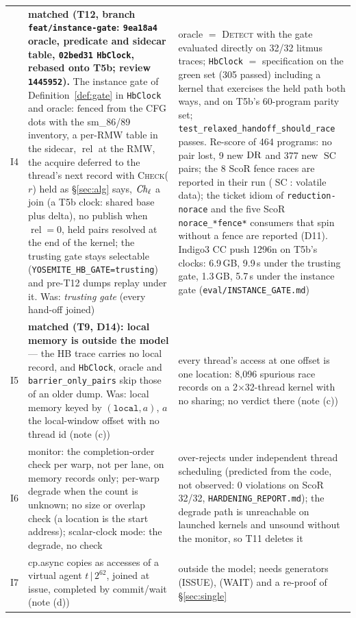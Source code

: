 \documentclass[11pt]{article}
\theoremstyle{remark}
\DeclareMathOperator{\rel}{rel}\DeclareMathOperator{\acq}{acq}\DeclareMathOperator{\key}{key}
\DeclareMathOperator{\SC}{SC}
\begin{document}
\begin{table}[!htbp]
\begin{tabular}{@{}lp{6.4cm}p{6.2cm}@{}}
I4 & \textbf{matched (T12, branch \texttt{feat/instance-gate}: \texttt{9ea18a4} oracle, predicate and sidecar table, \texttt{02bed31} \texttt{HbClock}, rebased onto T5b; review \texttt{1445952}).} The instance gate of Definition~\ref{def:gate} in \texttt{HbClock} and oracle: $\mathrm{fenced}$ from the CFG dots with the sm\_86/89 inventory, a per-RMW table in the sidecar, $\rel$ at the RMW, the acquire deferred to the thread's next record with \textsc{Check}($r$) held as \S\ref{sec:alg} says, $\mathit{Ch}_\ell$ a join (a T5b clock: shared base plus delta), no publish when $\rel=0$, held pairs resolved at the end of the kernel; the trusting gate stays selectable (\texttt{YOSEMITE\_HB\_GATE=trusting}) and pre-T12 dumps replay under it. Was: \emph{trusting gate} (every hand-off joined) & oracle $=$ \textsc{Detect} with the gate evaluated directly on 32/32 litmus traces; \texttt{HbClock} $=$ specification on the green set (305 passed) including a kernel that exercises the held path both ways, and on T5b's 60-program parity set; \texttt{test\_relaxed\_handoff\_should\_race} passes. Re-score of 464 programs: no pair lost, 9 new $\operatorname{DR}$ and 377 new $\SC$ pairs; the 8 ScoR fence races are reported in their run ($\SC$: volatile data); the ticket idiom of \texttt{reduction-norace} and the five ScoR \texttt{norace\_*fence*} consumers that spin without a fence are reported (D11). Indigo3 CC push 1296n on T5b's clocks: 6.9\,GB, 9.9\,s under the trusting gate, 1.3\,GB, 5.7\,s under the instance gate (\texttt{eval/INSTANCE\_GATE.md}) \\
I5 & \textbf{matched (T9, D14): local memory is outside the model} --- the HB trace carries no local record, and \texttt{HbClock}, oracle and \texttt{barrier\_only\_pairs} skip those of an older dump. Was: local memory keyed by $(\mathtt{local},a)$, $a$ the local-window offset with no thread id (note (c)) & every thread's access at one offset is one location: 8,096 spurious race records on a 2$\times$32-thread kernel with no sharing; no verdict there (note (c)) \\
I6 & monitor: the completion-order check per warp, not per lane, on memory records only; per-warp degrade when the count is unknown; no size or overlap check (a location is the start address); scalar-clock mode: the degrade, no check & over-rejects under independent thread scheduling (predicted from the code, not observed: 0 violations on ScoR 32/32, \texttt{HARDENING\_REPORT.md}); the degrade path is unreachable on launched kernels and unsound without the monitor, so T11 deletes it \\
I7 & cp.async copies as accesses of a virtual agent $t\,|\,2^{62}$, joined at issue, completed by commit/wait (note (d)) & outside the model; needs generators (ISSUE), (WAIT) and a re-proof of \S\ref{sec:single} \\
\bottomrule
\end{tabular}
\end{table}
\end{document}

